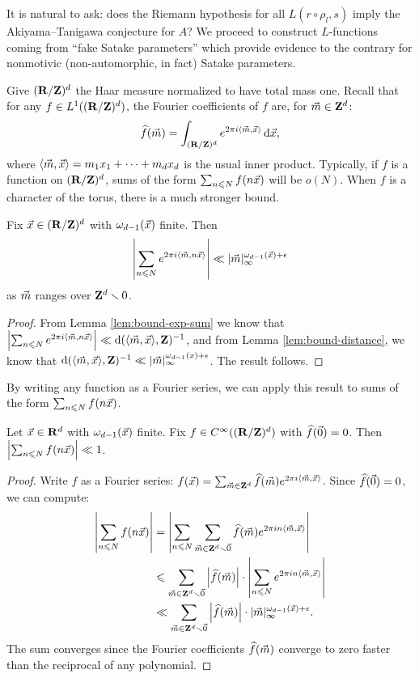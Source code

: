 It is natural to ask: does the Riemann hypothesis for all $L(r\circ \rho_l,s)$ 
imply the Akiyama--Tanigawa conjecture for $A$? We proceed to construct 
$L$-functions coming from ``fake Satake parameters'' which provide evidence to 
the contrary for nonmotivic (non-automorphic, in fact) Satake parameters. 

Give $(\mathbf{R}/\mathbf{Z})^d$ the Haar measure normalized to have total mass one. 
Recall that for any $f\in L^1((\mathbf{R}/\mathbf{Z})^d)$, the Fourier coefficients of $f$ 
are, for $\vec{m}\in \mathbf{Z}^d$: 
\[
	\widehat f(\vec{m}) = \int_{(\mathbf{R}/\mathbf{Z})^d} e^{2\pi i \langle \vec{m},\vec{x}\rangle} \, \mathrm{d} \vec{x} ,
\]
where $\langle \vec{m},\vec{x}\rangle = m_1 x_1 + \cdots + m_d x_d$ is the usual inner 
product. Typically, if $f$ is a function on $(\mathbf{R}/\mathbf{Z})^d$, sums of the form 
$\sum_{n\leqslant N} f(n \vec{x})$ will be $o(N)$. When $f$ is a character of the 
torus, there is a much stronger bound. 

\begin{theorem}
Fix $\vec{x}\in (\mathbf{R}/\mathbf{Z})^d$ with $\omega_{d-1}(\vec{x})$ finite. Then 
\[
	\left| \sum_{n\leqslant N} e^{2\pi i \langle \vec{m}, n \vec{x}\rangle}\right| \ll |\vec{m}|_\infty^{\omega_{d-1}(\vec{x}) + \epsilon} 
\]
as $\vec{m}$ ranges over $\mathbf{Z}^d\smallsetminus 0$. 
\end{theorem}
\begin{proof}
From Lemma \ref{lem:bound-exp-sum} we know that 
$\left| \sum_{n\leqslant N} e^{2\pi i \langle \vec{m}, n \vec{x}\rangle}\right| \ll \mathrm{d}(\langle \vec{m}, \vec{x}\rangle,\mathbf{Z})^{-1}$, 
and from Lemma \ref{lem:bound-distance}, we know that 
$\mathrm{d}(\langle \vec{m},\vec{x}\rangle, \mathbf{Z})^{-1} \ll |\vec{m}|_\infty^{\omega_{d-1}(x)+\epsilon}$. 
The result follows. 
\end{proof}

By writing any function as a Fourier series, we can apply this result to sums 
of the form $\sum_{n\leqslant N} f(n \vec{x})$. 

\begin{theorem}\label{thm:translates-bound-sum}
Let $\vec{x}\in \mathbf{R}^d$ with $\omega_{d-1}(\vec{x})$ finite. Fix 
$f\in C^\infty((\mathbf{R}/\mathbf{Z})^d)$ with $\widehat f(\vec{0})=0$. Then 
$\left| \sum_{n\leqslant N} f(n \vec{x})\right| \ll 1$. 
\end{theorem}
\begin{proof}
Write $f$ as a Fourier series:
$f(\vec{x}) = \sum_{\vec{m}\in \mathbf{Z}^d} \widehat f(\vec{m}) e^{2\pi i \langle \vec{m},\vec{x}\rangle}$. 
Since $\widehat f(\vec{0})=0$, we can compute:
\begin{align*}
	\left| \sum_{n\leqslant N} f(n \vec{x})\right| 
		&= \left| \sum_{n\leqslant N} \sum_{\vec{m}\in \mathbf{Z}^d\smallsetminus \vec{0}} \widehat f(\vec{m}) e^{2\pi i n \langle \vec{m},\vec{x}\rangle}\right| \\
		&\leqslant \sum_{\vec{m}\in \mathbf{Z}^d\smallsetminus \vec{0}} \left|\widehat f(\vec{m})\right|\cdot \left| \sum_{n\leqslant N} e^{2\pi i n \langle \vec{m},\vec{x}\rangle}\right| \\
		&\ll \sum_{\vec{m}\in \mathbf{Z}^d\smallsetminus \vec{0}} \left|\widehat f(\vec{m})\right|\cdot |\vec{m}|_\infty^{\omega_{d-1}(\vec{x}) + \epsilon} .
\end{align*}
The sum converges since the Fourier coefficients $\widehat f(\vec{m})$ converge to 
zero faster than the reciprocal of any polynomial. 
\end{proof}

